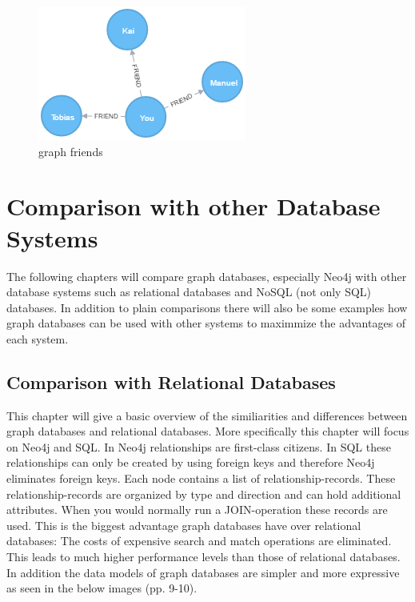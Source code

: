 \begin{figure}[H]
	\includegraphics[width=\linewidth,keepaspectratio]{images/neo4j/friends.png}
	\caption{graph friends}
\end{figure}

\section{Comparison with other Database Systems}

The following chapters will compare graph databases, especially Neo4j with other database systems such as relational databases and NoSQL (not only SQL) databases. In addition to plain comparisons there will also be some examples how graph databases can be used with other systems to maximmize the advantages of each system.

\subsection{Comparison with Relational Databases}

This chapter will give a basic overview of the similiarities and differences between graph databases and relational databases. More specifically this chapter will focus on Neo4j and SQL. 
In Neo4j relationships are first-class citizens. In SQL these relationships can only be created by using foreign keys and therefore Neo4j eliminates foreign keys. Each node contains a list of relationship-records. These relationship-records are organized by type and direction and can hold additional attributes. When you would normally run a JOIN-operation these records are used. This is the biggest advantage graph databases have over relational databases: The costs of expensive search and match operations are eliminated.
This leads to much higher performance levels than those of relational databases.
In addition the data models of graph databases are simpler and more expressive as seen in the below images \cite{HungerBoydLyon.2016} (pp. 9-10).

